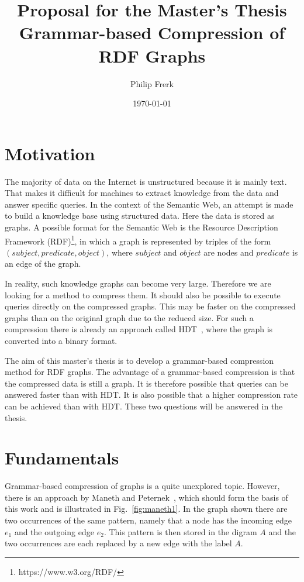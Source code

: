 \documentclass[a4paper]{scrartcl}
\title{Proposal for the Master's Thesis\\Grammar-based Compression of RDF Graphs}
\author{Philip Frerk}
\date{\today}
\begin{document}
\maketitle

\section{Motivation}\label{sec:motivation}

The majority of data on the Internet is unstructured because it is mainly text. That makes it difficult for machines to extract knowledge from the data and answer specific queries. In the context of the Semantic Web, an attempt is made to build a knowledge base using structured data. Here the data is stored as graphs. A possible format for the Semantic Web is the Resource Description Framework (RDF)\footnote{\label{foot:2}https://www.w3.org/RDF/}, in which a graph is represented by triples of the form $ (subject, predicate, object) $, where $ subject $ and $object$ are nodes and $predicate$ is an edge of the graph. 

In reality, such knowledge graphs can become very large. Therefore we are looking for a method to compress them. It should also be possible to execute queries directly on the compressed graphs. This may be faster on the compressed graphs than on the original graph due to the reduced size. For such a compression there is already an approach called HDT~\cite{hdt}, where the graph is converted into a binary format.

The aim of this master's thesis is to develop a grammar-based compression method for RDF graphs. The advantage of a grammar-based compression is that the compressed data is still a graph. It is therefore possible that queries can be answered faster than with HDT. It is also possible that a higher compression rate can be achieved than with HDT. These two questions will be answered in the thesis.


\section{Fundamentals}

Grammar-based compression of graphs is a quite unexplored topic. However, there is an approach by Maneth and Peternek~\cite{maneth}, which should form the basis of this work and is illustrated in Fig.~\ref{fig:maneth1}. In the graph shown there are two occurrences of the same pattern, namely that a node has the incoming edge $e_1$  and the outgoing edge $e_2$. This pattern is then stored in the digram $A$ and the two occurrences are each replaced by a new edge with the label $A$. 
\end{document}
